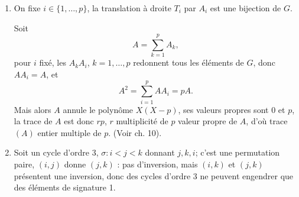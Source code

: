 \begin{enumerate}[label=\arabic*.,leftmargin=2.2em,itemsep=1.2em]
Si $K$ est sous-groupe d'indice $n$ et de cardinal $p$, le cardinal de $G$ est $np$.

Or, si $x\in K$, $xKx^{-1}=K$, (car $xKx^{-1}\subset K$, stable par produit, et $y\mapsto xyx^{-1}$ étant un automorphisme sur $G$, $xKx^{-1}$ et $K$ sont de même cardinal fini). Donc $K\subset N_G(K)$, et comme le nombre de conjugués de $K$ est
\[
\frac{np}{\operatorname{card}(N_G(K))}
\]
il est inférieur ou égal à
\[
\frac{np}{\operatorname{card}K}=\frac{np}{p}=n.
\]

Soit enfin $H$ un sous-groupe de $G$, distinct de $G$, d'indice $n$ et de cardinal $p$. On a encore card $G=np$ avec $n>1$, sinon card $G=p=$ card $H$, ce qui contredit $H\ne G$.

Chaque conjugué $xHx^{-1}$ de $H$ contient $p$ éléments dont $e$ élément neutre, et donc $p-1$ éléments $\ne e$.

Il y a au plus $n$ conjugués distincts. , d'où le cardinal de la réunion des conjugués de $H$ majoré par
\[
1+n(p-1)=np-(n-1).
\]
Comme $n>1$, on a $1+n(p-1)<np=$ card$(G)$ : la réunion des conjugués de $H$ ne recouvre pas $G$.

\item On fixe $i\in\{1,\ldots,p\}$, la translation à droite $T_i$ par $A_i$ est une bijection de $G$.

Soit
\[
A=\sum_{k=1}^{p}A_k,
\]
pour $i$ fixé, les $A_kA_i$, $k=1,\ldots,p$ redonnent tous les éléments de $G$, donc $AA_i=A$, et
\[
A^2=\sum_{i=1}^{p}AA_i=pA.
\]
Mais alors $A$ annule le polynôme $X(X-p)$, ses valeurs propres sont $0$ et $p$, la trace de $A$ est donc $rp$, $r$ multiplicité de $p$ valeur propre de $A$, d'où trace$(A)$ entier multiple de $p$. (Voir ch. 10).

\item Soit un cycle d'ordre 3, $\sigma:i<j<k$ donnant $j,k,i$; c'est une permutation paire, $(i,j)$ donne $(j,k)$ : pas d'inversion, mais $(i,k)$ et $(j,k)$ présentent une inversion, donc des cycles d'ordre 3 ne peuvent engendrer que des éléments de signature 1.


\end{enumerate}
